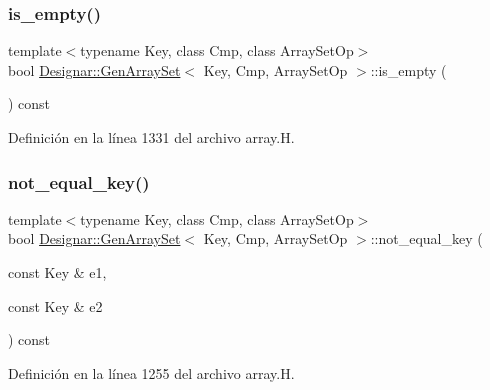 \subsubsection{\texorpdfstring{is\+\_\+empty()}{is\_empty()}}
{\footnotesize\ttfamily template$<$typename Key, class Cmp, class Array\+Set\+Op$>$ \\
bool \hyperlink{class_designar_1_1_gen_array_set}{Designar\+::\+Gen\+Array\+Set}$<$ Key, Cmp, Array\+Set\+Op $>$\+::is\+\_\+empty (\begin{DoxyParamCaption}{ }\end{DoxyParamCaption}) const\hspace{0.3cm}{\ttfamily [inline]}}



Definición en la línea 1331 del archivo array.\+H.

\mbox{\label{class_designar_1_1_gen_array_set_a048871f9ab15af3c26cfda4dbb47d272}} 
\subsubsection{\texorpdfstring{not\+\_\+equal\+\_\+key()}{not\_equal\_key()}}
{\footnotesize\ttfamily template$<$typename Key, class Cmp, class Array\+Set\+Op$>$ \\
bool \hyperlink{class_designar_1_1_gen_array_set}{Designar\+::\+Gen\+Array\+Set}$<$ Key, Cmp, Array\+Set\+Op $>$\+::not\+\_\+equal\+\_\+key (\begin{DoxyParamCaption}\item[{const Key \&}]{e1,  }\item[{const Key \&}]{e2 }\end{DoxyParamCaption}) const\hspace{0.3cm}{\ttfamily [inline]}}



Definición en la línea 1255 del archivo array.\+H.

\mbox{\label{class_designar_1_1_gen_array_set_ab30a4cf17a20eb6005cfed15762c1568}} 
